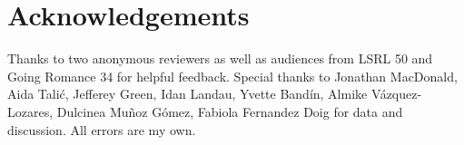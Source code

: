 \documentclass[output=paper,colorlinks,citecolor=brown]{langscibook}
\begin{document}
\section*{Acknowledgements}
Thanks to two anonymous reviewers as well as audiences from LSRL 50 and Going Romance 34 for helpful feedback. Special thanks to Jonathan MacDonald, Aida Talić, Jefferey Green, Idan Landau, Yvette Bandín, Almike Vázquez-Lozares, Dulcinea Muñoz Gómez, Fabiola Fernandez Doig for data and discussion. All errors are my own.


\printbibliography[heading=subbibliography,notkeyword=this]
\end{document}
